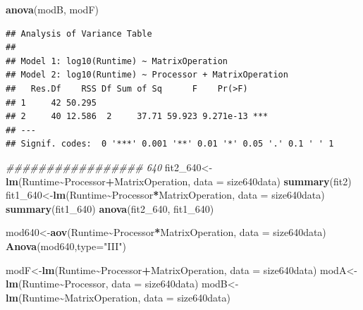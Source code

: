 \documentclass[
]{article}
\newenvironment{Shaded}{\begin{snugshade}}{\end{snugshade}}
\newcommand{\CommentTok}[1]{\textcolor[rgb]{0.56,0.35,0.01}{\textit{#1}}}
\newcommand{\DataTypeTok}[1]{\textcolor[rgb]{0.13,0.29,0.53}{#1}}
\newcommand{\DecValTok}[1]{\textcolor[rgb]{0.00,0.00,0.81}{#1}}
\newcommand{\KeywordTok}[1]{\textcolor[rgb]{0.13,0.29,0.53}{\textbf{#1}}}
\newcommand{\NormalTok}[1]{#1}
\newcommand{\OperatorTok}[1]{\textcolor[rgb]{0.81,0.36,0.00}{\textbf{#1}}}
\newcommand{\StringTok}[1]{\textcolor[rgb]{0.31,0.60,0.02}{#1}}
\begin{document}
\begin{Shaded}
\begin{Highlighting}[]
\KeywordTok{anova}\NormalTok{(modB, modF)}
\end{Highlighting}
\end{Shaded}

\begin{verbatim}
## Analysis of Variance Table
## 
## Model 1: log10(Runtime) ~ MatrixOperation
## Model 2: log10(Runtime) ~ Processor + MatrixOperation
##   Res.Df    RSS Df Sum of Sq      F    Pr(>F)    
## 1     42 50.295                                  
## 2     40 12.586  2     37.71 59.923 9.271e-13 ***
## ---
## Signif. codes:  0 '***' 0.001 '**' 0.01 '*' 0.05 '.' 0.1 ' ' 1
\end{verbatim}

\begin{Shaded}
\begin{Highlighting}[]
\CommentTok{\#\#\#\#\#\#\#\#\#\#\#\#\#\#\#\#\# 640}
\NormalTok{fit2\_}\DecValTok{640}\NormalTok{\textless{}{-}}\KeywordTok{lm}\NormalTok{(Runtime}\OperatorTok{\textasciitilde{}}\NormalTok{Processor}\OperatorTok{+}\NormalTok{MatrixOperation, }\DataTypeTok{data =}\NormalTok{ size640data)}
\KeywordTok{summary}\NormalTok{(fit2)}
\NormalTok{fit1\_}\DecValTok{640}\NormalTok{\textless{}{-}}\KeywordTok{lm}\NormalTok{(Runtime}\OperatorTok{\textasciitilde{}}\NormalTok{Processor}\OperatorTok{*}\NormalTok{MatrixOperation, }\DataTypeTok{data =}\NormalTok{ size640data)}
\KeywordTok{summary}\NormalTok{(fit1\_}\DecValTok{640}\NormalTok{)}
\KeywordTok{anova}\NormalTok{(fit2\_}\DecValTok{640}\NormalTok{, fit1\_}\DecValTok{640}\NormalTok{)}

\NormalTok{mod640\textless{}{-}}\KeywordTok{aov}\NormalTok{(Runtime}\OperatorTok{\textasciitilde{}}\NormalTok{Processor}\OperatorTok{*}\NormalTok{MatrixOperation, }\DataTypeTok{data =}\NormalTok{ size640data)}
\KeywordTok{Anova}\NormalTok{(mod640,}\DataTypeTok{type=}\StringTok{"III"}\NormalTok{)}


\NormalTok{modF\textless{}{-}}\KeywordTok{lm}\NormalTok{(Runtime}\OperatorTok{\textasciitilde{}}\NormalTok{Processor}\OperatorTok{+}\NormalTok{MatrixOperation, }\DataTypeTok{data =}\NormalTok{ size640data)}
\NormalTok{modA\textless{}{-}}\KeywordTok{lm}\NormalTok{(Runtime}\OperatorTok{\textasciitilde{}}\NormalTok{Processor, }\DataTypeTok{data =}\NormalTok{ size640data)}
\NormalTok{modB\textless{}{-}}\KeywordTok{lm}\NormalTok{(Runtime}\OperatorTok{\textasciitilde{}}\NormalTok{MatrixOperation, }\DataTypeTok{data =}\NormalTok{ size640data)}


\end{Highlighting}
\end{Shaded}
\end{document}
